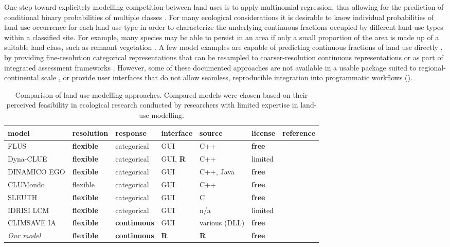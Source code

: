 \documentclass[titlesmallcaps,copyrightpage]{uomthesis}\usepackage[]{graphicx}\usepackage[]{color}
\begin{document}
One step toward explicitely modelling competition between land uses is
to apply multinomial regression, thus allowing for the prediction of
conditional binary probabilities of multiple classes
\citep{noszczyk_review_2019}. For many ecological considerations it is
desirable to know individual probabilities of land use occurrence for
each land use type in order to characterize the underlying continuous
fractions occupied by different land use types within a classified site.
For example, many species may be able to persist in an area if only a
small proportion of the area is made up of a suitable land class, such
as remnant vegetation \citep{wintle_global_2019}. A few model examples
are capable of predicting continuous fractions of land use directly
\citep[see][]{hasegawa_global_2017, meiyappan_spatial_2014}, by
providing fine-resolution categorical representations that can be
resampled to coarser-resolution continuous representations \citep[see
Future Land Use Simulation Model (FLUS),][]{liu_future_2017} or as part
of integrated assessment frameworks \citep[see CLIMSAVE
IA,][]{harrison_combining_2013}. However, some of these documented
approaches are not available in a usable package suited to
regional-continental scale
\citep{hasegawa_global_2017, meiyappan_spatial_2014}, or provide user
interfaces that do not allow seamless, reproducible integration into
programmatic workflows \citep{harrison_combining_2013, liu_future_2017}
().

\begin{table}[tbp]
\caption{Comparison of land-use modelling approaches. Compared models were chosen based on their perceived feasibility in ecological research conducted by researchers with limited expertise in land-use modelling.}
\label{ch3:tab1}
\begin{tabularx}{\textwidth} {@{}llllllY@{}}
\toprule 
model & resolution & response & interface & source & license & reference \\
\toprule 
FLUS    & \textbf{flexible} & categorical & GUI & C++ & \textbf{free} & \citep{liu_future_2017} \\
Dyna-CLUE   & \textbf{flexible} & categorical & GUI, \textbf{R} & C++ & limited & \citep{verburg_combining_2009} \\
DINAMICO EGO & \textbf{flexible} & categorical &    GUI & C++, Java & \textbf{free} & \cite{soares-filho_modeling_2009} \\
CLUMondo & flexible &   categorical & GUI & C++ & \textbf{free} & \cite{van_asselen_land_2013} \\
SLEUTH & \textbf{flexible} & categorical & GUI & C & \textbf{free} & \cite{dietzel_toward_2007} \\
IDRISI LCM & \textbf{flexible} & categorical & GUI & n/a & limited & \cite{eastman_short_2018} \\
CLIMSAVE IA & \textbf{flexible} & \textbf{continuous} & GUI & various (DLL) &   \textbf{free} & \cite{harrison_combining_2013} \\
\textit{Our model} & \textbf{flexible} & \textbf{continuous} & \textbf{R} & \textbf{R} & \textbf{free}  & \\
\bottomrule
\end{tabularx}
\end{table}
\end{document}
